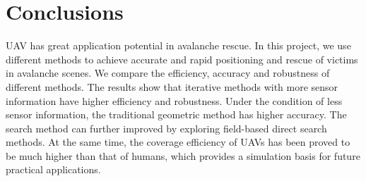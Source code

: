 \documentclass[conference]{IEEEtran}
\begin{document}
\section{Conclusions}\label{setion:Conclusion}
UAV has great application potential in avalanche rescue. In this project, we use different methods to achieve accurate and rapid positioning and rescue of victims in avalanche scenes. We compare the efficiency, accuracy and robustness of different methods. The results show that iterative methods with more sensor information have higher efficiency and robustness. Under the condition of less sensor information, the traditional geometric method has higher accuracy. The search method can further improved by exploring field-based direct search methods. At the same time, the coverage efficiency of UAVs has been proved to be much higher than that of humans, which provides a simulation basis for future practical applications.

{\small


}
\end{document}
